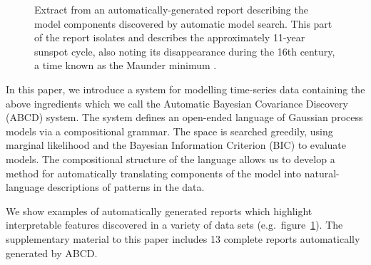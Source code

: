 \documentclass[letterpaper]{article}
\begin{document}
\begin{figure}[t]
\centering
{}
\caption{Extract from an automatically-generated report describing the model components discovered by automatic model search.  This part of the report isolates and describes the approximately 11-year sunspot cycle, also noting its disappearance during the 16th century, a time known as the Maunder minimum \citep{lean1995reconstruction}.}
\label{fig:periodic}
\end{figure}

In this paper,  we introduce a system for modelling time-series data
 containing the above ingredients which we call the Automatic
Bayesian Covariance Discovery (ABCD) system. The system defines an open-ended
language of Gaussian process models via a compositional grammar. The
space is searched greedily, using marginal likelihood and
the Bayesian Information Criterion (BIC) to evaluate models. The 
compositional structure of the language allows us to develop a method
for automatically translating components of the model into
natural-language descriptions of patterns in the data.

We show examples of automatically generated reports which highlight
interpretable features discovered in a variety of data sets (e.g.\
figure~\ref{fig:periodic}).  The supplementary material to this paper
includes 13 complete reports automatically generated by ABCD.
\end{document}
